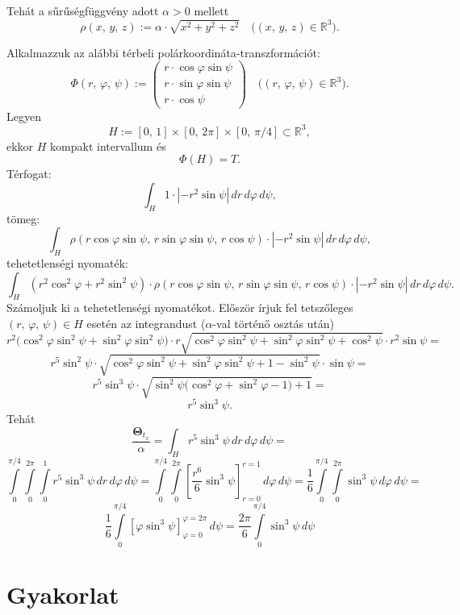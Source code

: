 \documentclass{article}
\newcommand{\R}{\mathbb{R}}
\begin{document}
	Tehát a sűrűségfüggvény adott $\alpha > 0$ mellett
	\[
		\rho(x, \, y, \, z) := \alpha \cdot \sqrt{x^2 + y^2 + z^2} \quad \big( (x, \, y, \, z) \in \R^3\big).
	\]

	Alkalmazzuk az alábbi térbeli polárkoordináta-transzformációt:
	\[
		\Phi(r, \, \varphi, \, \psi) := \begin{pmatrix}
			r \cdot \cos \varphi \sin \psi \\
			r \cdot \sin \varphi \sin \psi \\
			r \cdot \cos \psi
		\end{pmatrix} \quad \big( (r, \, \varphi, \, \psi) \in \R^3\big).
	\]
	Legyen
	\[
		H := [0, \, 1] \times [0, \, 2 \pi] \times [0, \, \pi / 4] \subset \R^3,
	\]
	ekkor $H$ kompakt intervallum és
	\[
		\Phi(H) = T.
	\]
	Térfogat:
	\[
		\int_H 1 \cdot |-r^2 \sin \psi| \, dr \, d\varphi \, d\psi,
	\]
	tömeg:
	\[
		\int_H \rho(r \cos \varphi \sin \psi, \, r \sin \varphi \sin \psi, \, r \cos \psi) \cdot |-r^2 \sin \psi| \, dr \, d\varphi \, d\psi,
	\]
	tehetetlenségi nyomaték:
	\[
		\int_H (r^2 \cos^2\varphi + r^2 \sin^2 \psi) \cdot \rho(r \cos \varphi \sin \psi, \, r \sin \varphi \sin \psi, \, r \cos \psi) \cdot |-r^2 \sin \psi| \, dr \, d\varphi \, d\psi.
	\]
	Számoljuk ki a tehetetlenségi nyomatékot. Először írjuk fel tetszőleges $(r, \, \varphi, \, \psi) \in H$ esetén az integrandust ($\alpha$-val történő osztás után)
	\[
		r^2 \big( \cos^2 \varphi \sin^2 \psi + \sin^2 \varphi \sin^2 \psi \big) \cdot r \sqrt{\cos^2 \varphi \sin^2 \psi + \sin^2 \varphi \sin^2 \psi + \cos^2 \psi} \cdot r^2 \sin \psi =
	\]
	\[
		r^5 \sin^2 \psi \cdot \sqrt{\cos^2 \varphi \sin^2 \psi + \sin^2 \varphi \sin^2 \psi + 1 - \sin^2 \psi} \cdot \sin \psi =
	\]
	\[
		r^5 \sin^3 \psi \cdot \sqrt{ \sin^2 \psi \big( \cos^2 \varphi + \sin^2 \varphi - 1 \big) + 1} =
	\]
	\[
		r^5 \sin^3 \psi.
	\]
	Tehát
	\[
		\frac{\mathbf{\Theta}_{t_x}}{\alpha} = \int_H r^5 \sin^3 \psi \, dr \, d\varphi \, d \psi =
	\]
	\[
		\int\limits_0^{\pi / 4} \int\limits_0^{2 \pi} \int \limits_0^{1} r^5 \sin^3 \psi \, dr \, d\varphi \, d\psi = \int\limits_0^{\pi / 4} \int\limits_0^{2 \pi} \left[ \frac{r^6}{6} \sin^3 \psi \right]_{r=0}^{r=1} \, d\varphi \, d\psi = \frac{1}{6} \int\limits_0^{\pi / 4} \int\limits_0^{2 \pi} \sin^3 \psi \, d\varphi \, d\psi =
	\]
	\[
		\frac{1}{6} \int\limits_0^{\pi / 4} [\varphi \sin^3\psi]_{\varphi=0}^{\varphi=2\pi} \, d\psi = \frac{2 \pi}{6} \int\limits_0^{\pi / 4} \sin^3\psi \, d\psi
	\]

	\newpage
	\section{Gyakorlat}
\end{document}
